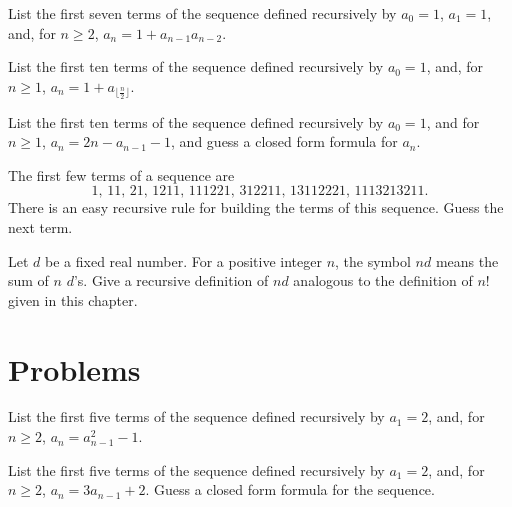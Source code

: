 \begin{exer}
List the first seven terms of the sequence defined recursively by
$a_{0} = 1$, $a_{1}= 1$, and, for $n\geq 2$, $a_{n} = 1+a_{n-1}a_{n-2}$.
\end{exer}

\begin{exer}
List the first ten terms of the sequence defined recursively by
$a_{0} = 1$, and, for $n\geq 1$, $a_{n} = 1+a_{\lfloor{\frac{n}{2}}\rfloor}$.
\end{exer}

\begin{exer}
List  the first ten terms of the sequence defined recursively by
$a_{0} = 1$, and for $n\geq 1$, $a_n = 2n-a_{n-1}-1$, and guess
a closed form formula for $a_n$.
\end{exer}

\begin{exer}
The first few terms of a sequence are 
\[
1,\, 11,\,21,\,1211,\,111221,\,312211,\,13112221,\,1113213211.
\]
There is an easy recursive rule for building  the terms of this sequence. Guess the next term.
\end{exer}

\begin{exer}
Let $d$ be a fixed real number.
 For a positive integer $n$,
the symbol $nd$ means the sum of $n$ $d$'s.  Give  a recursive definition of $nd$
analogous to the definition of $n!$ given in this chapter.
\end{exer}

\clearpage

\section{Problems}

\begin{prob}

 List the first five terms of the sequence defined recursively by
 $a_1 = 2$, and, for $n\geq 2$, $a_n = a_{n-1}^2 -1$.
 
\end{prob}

\begin{prob}
 
List the first five terms of the sequence defined recursively by
$a_1 =2$, and, for $n\geq 2$, $a_n = 3a_{n-1}+2$. Guess a closed
form formula %
for the sequence.
  
\end{prob}

